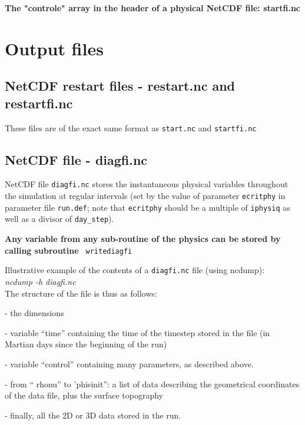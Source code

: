\noindent
{\bf The "controle" array in the header of a physical NetCDF file:
startfi.nc}


\newpage
\section{Output files}

\subsection{NetCDF restart files - restart.nc and restartfi.nc}
These files are of the exact same format as {\tt start.nc} and
{\tt startfi.nc}

\subsection{ NetCDF file - diagfi.nc}
NetCDF file {\tt diagfi.nc} stores the instantaneous physical variables
throughout the simulation at regular intervals
(set by the value of parameter {\tt ecritphy} in
parameter file {\tt run.def}; note that {\tt ecritphy} should be a
multiple of {\tt iphysiq} as well as a divisor of {\tt day\_step}).

\noindent
{\bf Any variable from any sub-routine of the physics can be stored
by calling subroutine}
\verb+ writediagfi+


\noindent
Illustrative example of the contents of a {\tt diagfi.nc}
file (using ncdump):\\
\noindent
{\it ncdump -h diagfi.nc}\\


\noindent
The structure of the file is thus as follows:
\begin{description}
\item- the dimensions
\item- variable ``time'' containing the time of the timestep stored in the
 file (in Martian days since the beginning of the run)
\item- variable ``control'' containing many parameters, as described above.
\item- from `` rhonu'' to 'phisinit'': a list of data describing the
 geometrical coordinates of the data file, plus the surface topography
\item- finally, all the 2D or 3D data stored in the run.
\end{description}


